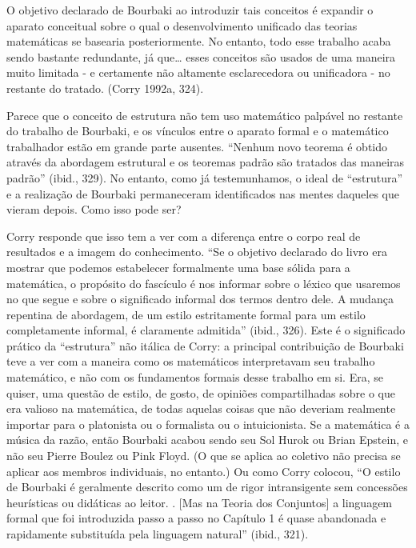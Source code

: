 \documentclass[12pt]{article}
\begin{document}
O objetivo declarado de Bourbaki ao introduzir tais conceitos é expandir o aparato conceitual sobre o qual o desenvolvimento unificado das teorias matemáticas se basearia posteriormente. No entanto, todo esse trabalho acaba sendo bastante redundante, já que… esses conceitos são usados de uma maneira muito limitada - e certamente não altamente esclarecedora ou unificadora - no restante do tratado. (Corry 1992a, 324).

Parece que o conceito de estrutura não tem uso matemático palpável no restante do trabalho de Bourbaki, e os vínculos entre o aparato formal e o matemático trabalhador estão em grande parte ausentes. “Nenhum novo teorema é obtido através da abordagem estrutural e os teoremas padrão são tratados das maneiras padrão” (ibid., 329). No entanto, como já testemunhamos, o ideal de “estrutura” e a realização de Bourbaki permaneceram identificados nas mentes daqueles que vieram depois. Como isso pode ser?

Corry responde que isso tem a ver com a diferença entre o corpo real de resultados e a imagem do conhecimento. “Se o objetivo declarado do livro era mostrar que podemos estabelecer formalmente uma base sólida para a matemática, o propósito do fascículo é nos informar sobre o léxico que usaremos no que segue e sobre o significado informal dos termos dentro dele. A mudança repentina de abordagem, de um estilo estritamente formal para um estilo completamente informal, é claramente admitida” (ibid., 326). Este é o significado prático da “estrutura” não itálica de Corry: a principal contribuição de Bourbaki teve a ver com a maneira como os matemáticos interpretavam seu trabalho matemático, e não com os fundamentos formais desse trabalho em si. Era, se quiser, uma questão de estilo, de gosto, de opiniões compartilhadas sobre o que era valioso na matemática, de todas aquelas coisas que não deveriam realmente importar para o platonista ou o formalista ou o intuicionista. Se a matemática é a música da razão, então Bourbaki acabou sendo seu Sol Hurok ou Brian Epstein, e não seu Pierre Boulez ou Pink Floyd. (O que se aplica ao coletivo não precisa se aplicar aos membros individuais, no entanto.) Ou como Corry colocou, “O estilo de Bourbaki é geralmente descrito como um de rigor intransigente sem concessões heurísticas ou didáticas ao leitor. . [Mas na Teoria dos Conjuntos] a linguagem formal que foi introduzida passo a passo no Capítulo 1 é quase abandonada e rapidamente substituída pela linguagem natural” (ibid., 321).
\end{document}
